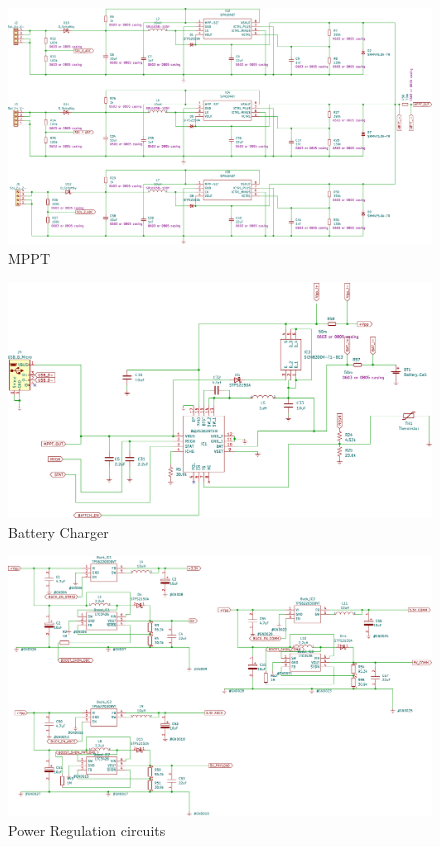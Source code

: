   \begin{figure}[h]
 	\centering
 	\includegraphics[width=0.99\columnwidth]{FrontMatter/pcb-MPPTv2.pdf}
 	\caption{\centering MPPT}
 	\label{fig:mpp 4lr}
 \end{figure}
 
   \begin{figure}[H]
 	\centering
 	\includegraphics[width=0.99\columnwidth]{FrontMatter/pcb-Battery Charger.pdf}
 	\caption{\centering Battery Charger}
 	\label{fig:batt 4lr}
 \end{figure}


  \begin{figure}[H]
 	\centering
 	\includegraphics[width=0.99\columnwidth]{FrontMatter/pcb-Regulation Module.pdf}
 	\caption{\centering Power Regulation circuits}
 	\label{fig:reg 4lr}
 \end{figure}
 
